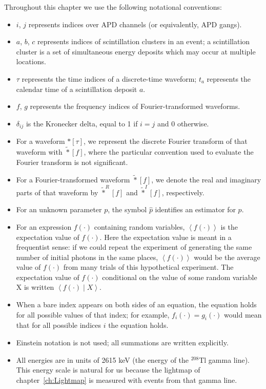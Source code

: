 Throughout this chapter we use the following notational conventions:
\begin{itemize}
\item $i$, $j$ represents indices over APD channels (or equivalently, APD gangs).
\item $a$, $b$, $c$ represents indices of scintillation clusters in an event; a scintillation cluster is a set of simultaneous energy deposits which may occur at multiple locations.
\item $\tau$ represents the time indices of a discrete-time waveform; $t_a$ represents the calendar time of a scintillation deposit $a$.
\item $f$, $g$ represents the frequency indices of Fourier-transformed waveforms.
\item $\delta_{ij}$ is the Kronecker delta, equal to 1 if $i = j$ and 0 otherwise.
\item For a waveform $*[\tau]$, we represent the discrete Fourier transform of that waveform with $\widetilde{*}[f]$, where the particular convention used to evaluate the Fourier transform is not significant.
\item For a Fourier-transformed waveform $\widetilde{*}[f]$, we denote the real and imaginary parts of that waveform by $\widetilde{*}^R[f]$ and $\widetilde{*}^I[f]$, respectively.
\item For an unknown parameter $p$, the symbol $\widehat{p}$ identifies an estimator for $p$.
\item For an expression $f(\cdot)$ containing random variables, $\left<f(\cdot)\right>$ is the expectation value of $f(\cdot)$.  Here the expectation value is meant in a frequentist sense: if we could repeat the experiment of generating the same number of initial photons in the same places, $\left<f(\cdot)\right>$ would be the average value of $f(\cdot)$ from many trials of this hypothetical experiment.  The expectation value of $f(\cdot)$ conditional on the value of some random variable X is written $\left<f(\cdot) \middle\vert X\right>$.
\item When a bare index appears on both sides of an equation, the equation holds for all possible values of that index; for example, $f_i(\cdot) = g_i(\cdot)$ would mean that for all possible indices $i$ the equation holds.
\item Einstein notation is not used; all summations are written explicitly.
\item All energies are in units of 2615 keV (the energy of the $^{208}$Tl gamma line).  This energy scale is natural for us because the lightmap of chapter~\ref{ch:Lightmap} is measured with events from that gamma line.
\end{itemize}

